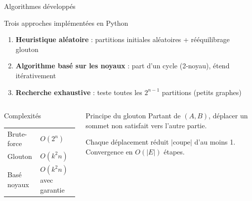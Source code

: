 \begin{frame}{Algorithmes d\'evelopp\'es}
  \begin{block}{Trois approches impl\'ement\'ees en Python}
    \begin{enumerate}
      \item \textbf{Heuristique al\'eatoire} : partitions initiales al\'eatoires + r\'e\'equilibrage glouton
      \item \textbf{Algorithme bas\'e sur les noyaux} : part d'un cycle (2-noyau), \'etend it\'erativement
      \item \textbf{Recherche exhaustive} : teste toutes les $2^{n-1}$ partitions (petits graphes)
    \end{enumerate}
  \end{block}

  \medskip

  \begin{columns}[T]
    \begin{exampleblock}{Complexit\'es}
      \begin{tabular}{@{}ll@{}}
        Brute-force & $O(2^n)$ \\
        Glouton & $O(k^2 n)$ \\
        Bas\'e noyaux & $O(k^2 n)$ avec garantie \\
      \end{tabular}
    \end{exampleblock}

    \begin{block}{Principe du glouton}
      Partant de $(A,B)$, d\'eplacer un sommet non satisfait vers l'autre partie.

      \medskip
      Chaque d\'eplacement r\'eduit $|\mathrm{coupe}|$ d'au moins 1.
      Convergence en $O(|E|)$ \'etapes.
    \end{block}
  \end{columns}
\end{frame}

